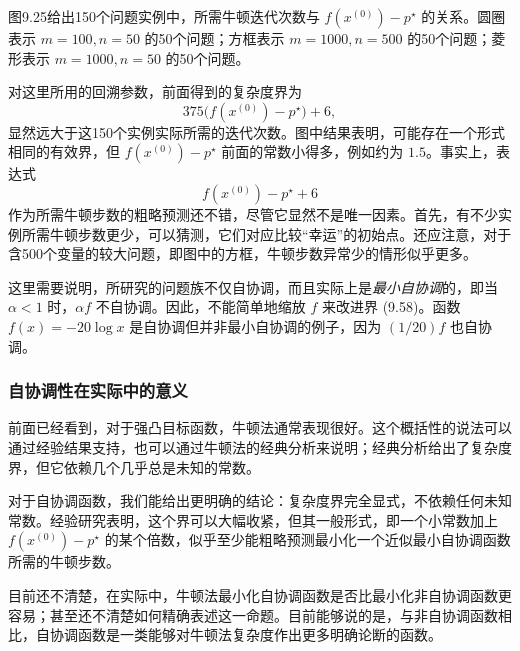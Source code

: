 图9.25给出150个问题实例中，所需牛顿迭代次数与 $f(x^{(0)})-p^\star$ 的关系。圆圈表示 $m=100,n=50$ 的50个问题；方框表示 $m=1000,n=500$ 的50个问题；菱形表示 $m=1000,n=50$ 的50个问题。

对这里所用的回溯参数，前面得到的复杂度界为
\begin{equation}
 375\bigl(f(x^{(0)})-p^\star\bigr)+6,\tag{9.58}
\end{equation}
显然远大于这150个实例实际所需的迭代次数。图中结果表明，可能存在一个形式相同的有效界，但 $f(x^{(0)})-p^\star$ 前面的常数小得多，例如约为 $1.5$。事实上，表达式
\[
 f(x^{(0)})-p^\star+6
\]
作为所需牛顿步数的粗略预测还不错，尽管它显然不是唯一因素。首先，有不少实例所需牛顿步数更少，可以猜测，它们对应比较“幸运”的初始点。还应注意，对于含500个变量的较大问题，即图中的方框，牛顿步数异常少的情形似乎更多。

这里需要说明，所研究的问题族不仅自协调，而且实际上是\emph{最小自协调}的，即当 $\alpha<1$ 时，$\alpha f$ 不自协调。因此，不能简单地缩放 $f$ 来改进界 (9.58)。函数 $f(x)=-20\log x$ 是自协调但并非最小自协调的例子，因为 $(1/20)f$ 也自协调。

\subsubsection*{自协调性在实际中的意义}
前面已经看到，对于强凸目标函数，牛顿法通常表现很好。这个概括性的说法可以通过经验结果支持，也可以通过牛顿法的经典分析来说明；经典分析给出了复杂度界，但它依赖几个几乎总是未知的常数。

对于自协调函数，我们能给出更明确的结论：复杂度界完全显式，不依赖任何未知常数。经验研究表明，这个界可以大幅收紧，但其一般形式，即一个小常数加上 $f(x^{(0)})-p^\star$ 的某个倍数，似乎至少能粗略预测最小化一个近似最小自协调函数所需的牛顿步数。

目前还不清楚，在实际中，牛顿法最小化自协调函数是否比最小化非自协调函数更容易；甚至还不清楚如何精确表述这一命题。目前能够说的是，与非自协调函数相比，自协调函数是一类能够对牛顿法复杂度作出更多明确论断的函数。
